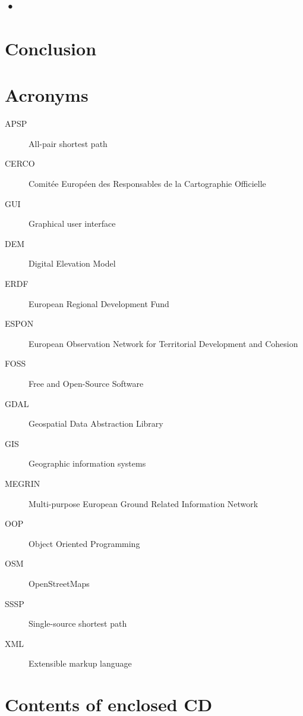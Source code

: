 \documentclass[thesis=M,english]{FITthesis}[2012/10/20]
\begin{document}
\section{•}

\chapter{Conclusion}





\appendix

\chapter{Acronyms}
\begin{description}
	\item[APSP] All-pair shortest path
	\item[CERCO] Comit{\' e}e Europ{\' e}en des Responsables de la Cartographie Officielle\item[GUI] Graphical user interface
	\item[DEM] Digital Elevation Model
	\item[ERDF] European Regional Development Fund
	\item[ESPON] European Observation Network for Territorial Development and Cohesion
	\item[FOSS] Free and Open-Source Software
	\item[GDAL] Geospatial Data Abstraction Library
	\item[GIS] Geographic information systems	
	\item[MEGRIN] Multi-purpose European Ground Related Information Network
	\item[OOP] Object Oriented Programming
	\item[OSM] OpenStreetMaps
	\item[SSSP] Single-source shortest path
	\item[XML] Extensible markup language
	
	
\end{description}


\chapter{Contents of enclosed CD}


\begin{figure}
\end{figure}
\end{document}
